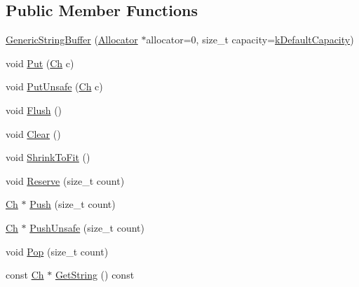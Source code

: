 \subsection*{Public Member Functions}
\begin{DoxyCompactItemize}
\item 
\mbox{\hyperlink{classrapidjson_1_1_generic_string_buffer_a96f9ddc4322573a15d086f29197a3d1b}{Generic\+String\+Buffer}} (\mbox{\hyperlink{classrapidjson_1_1_allocator}{Allocator}} $\ast$allocator=0, size\+\_\+t capacity=\mbox{\hyperlink{classrapidjson_1_1_generic_string_buffer_a56159d25a431109a2873e9455178eff0}{k\+Default\+Capacity}})
\item 
void \mbox{\hyperlink{classrapidjson_1_1_generic_string_buffer_a495081cfdd864623565606daf02f1187}{Put}} (\mbox{\hyperlink{classrapidjson_1_1_generic_string_buffer_a315f6f4528438a19d5a93eac3e2c99f0}{Ch}} c)
\item 
void \mbox{\hyperlink{classrapidjson_1_1_generic_string_buffer_a35733ffe70f63b28857b8d738b2ffad7}{Put\+Unsafe}} (\mbox{\hyperlink{classrapidjson_1_1_generic_string_buffer_a315f6f4528438a19d5a93eac3e2c99f0}{Ch}} c)
\item 
void \mbox{\hyperlink{classrapidjson_1_1_generic_string_buffer_aabe024dd7fc2ea0a0c929d7eea3d0b32}{Flush}} ()
\item 
void \mbox{\hyperlink{classrapidjson_1_1_generic_string_buffer_a614af5a72984c88bd5a65e2bc233d310}{Clear}} ()
\item 
void \mbox{\hyperlink{classrapidjson_1_1_generic_string_buffer_a7e688f68b88820655f717d3cc352b842}{Shrink\+To\+Fit}} ()
\item 
void \mbox{\hyperlink{classrapidjson_1_1_generic_string_buffer_ae70a632053e258c7c431e0e35b095c84}{Reserve}} (size\+\_\+t count)
\item 
\mbox{\hyperlink{classrapidjson_1_1_generic_string_buffer_a315f6f4528438a19d5a93eac3e2c99f0}{Ch}} $\ast$ \mbox{\hyperlink{classrapidjson_1_1_generic_string_buffer_aa848ba1b8220afb4103d8099cbd6d3ff}{Push}} (size\+\_\+t count)
\item 
\mbox{\hyperlink{classrapidjson_1_1_generic_string_buffer_a315f6f4528438a19d5a93eac3e2c99f0}{Ch}} $\ast$ \mbox{\hyperlink{classrapidjson_1_1_generic_string_buffer_acfdf31dc9458a63e4d6544d3079c8d2e}{Push\+Unsafe}} (size\+\_\+t count)
\item 
void \mbox{\hyperlink{classrapidjson_1_1_generic_string_buffer_afb41bae09405ddd9aa9250ac47ab235e}{Pop}} (size\+\_\+t count)
\item 
const \mbox{\hyperlink{classrapidjson_1_1_generic_string_buffer_a315f6f4528438a19d5a93eac3e2c99f0}{Ch}} $\ast$ \mbox{\hyperlink{classrapidjson_1_1_generic_string_buffer_a520c0f75424762ea44ebf6ecdd1931d8}{Get\+String}} () const

\end{DoxyCompactItemize}
